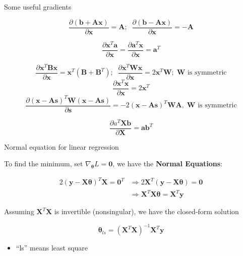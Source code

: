 \documentclass[ignorenonframetext,]{beamer}
\providecommand{\tightlist}{%
  \setlength{\itemsep}{0pt}\setlength{\parskip}{0pt}}
\newcommand{\vv}[1]{\boldsymbol{#1}}
\begin{document}
\begin{frame}{Some useful gradients}
\protect\hypertarget{some-useful-gradients}{}

\[\frac{\partial (\vv{b} + \vv{Ax})}{\partial \vv{x}} = \vv{A};\;\; \frac{\partial (\vv{b} - \vv{Ax})}{\partial \vv{x}} = -\vv{A}\]

\begin{equation*}
\frac{\partial \vv{x}^T \vv{a}}{\partial \vv{x}}= \frac{\partial \vv{a}^T \vv{x}}{\partial \vv{x}} = \vv{a}^T  
\end{equation*}

\[\frac{\partial\vv{x}^T\vv{B}\vv{x}}{\partial\vv{x}} = \vv{x}^{T}(\vv{B}+ \vv{B}^{T});\;\; \frac{\partial\vv{x}^T\vv{W}\vv{x}}{\partial\vv{x}} = 2\vv{x}^{T}\vv{W}; \; \vv{W}\text{ is symmetric}\]
\[\frac{\partial\vv{x}^T\vv{x}}{\partial\vv{x}} = 2\vv{x}^{T}\]
\[\frac{\partial(\vv{x}-\vv{As})^T\vv{W}(\vv{x}-\vv{As})}{\partial\vv{s}} = -2(\vv{x}-\vv{As})^T\vv{WA},\; \vv{W} \text{ is symmetric}\]

\[\frac{\partial a^T\vv{X}\vv{b}}{\partial\vv{X}} = \vv{ab}^{T}\]

\end{frame}

\begin{frame}{Normal equation for linear regression}
\protect\hypertarget{normal-equation-for-linear-regression}{}

To find the minimum, set \(\nabla_{\vv{\theta}} L =\vv{0}\), we have the
\textbf{Normal Equations}:

\begin{align*}
2(\vv{y}-\vv{X\theta})^{T}\vv{X} = \vv{0}^T &\Rightarrow 2\vv{X}^T (\vv{y}-\vv{X\theta})= \vv{0} \\ &\Rightarrow \vv{X}^T\vv{X}\vv{\theta} = \vv{X}^T\vv{y}
\end{align*} \bigskip

Assuming \(\vv{X}^T\vv{X}\) is invertible (nonsingular), we have the
closed-form solution

\[\vv{\theta}_{ls} = (\vv{X}^T\vv{X})^{-1}\vv{X}^{T}\vv{y}\]

\begin{itemize}
\tightlist
\item
  ``ls'' means least square
\end{itemize}

\end{frame}
\end{document}
